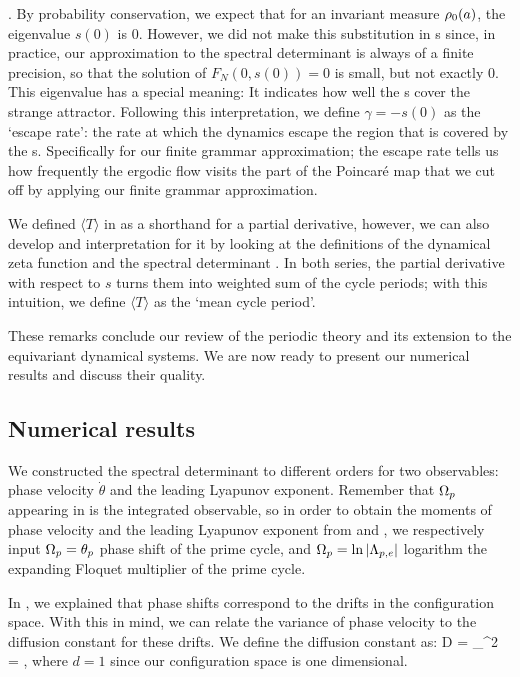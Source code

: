                         \label{e-Avgsigma} .
\eea
By probability conservation, we expect that for an invariant measure  $\rho_0(a)$,
the eigenvalue $s(0)$ is $0$. However, we did not make this substitution in \cycForm s since, in practice,
our approximation to the spectral determinant is always of a finite precision, so that
the solution of $F_N(0, s(0)) = 0$ is small, but not exactly $0$. This
eigenvalue has a special meaning: It indicates how well the \po s cover the
strange attractor. Following this interpretation, we define $\gamma = - s(0)$
as the `escape rate': the rate at which the dynamics escape the region that is
covered by the \po s. Specifically for our finite grammar approximation; the
escape rate tells us how frequently the ergodic flow visits the part of the
Poincar\'e map that we cut off by applying our finite grammar approximation.

We defined $\langle T \rangle$ in  as a shorthand for a partial
derivative, however, we can also develop and interpretation for it by looking
at the definitions of the dynamical zeta function  and the
spectral determinant . In both series, the partial
derivative with respect to $s$ turns them into weighted sum of the cycle
periods; with this intuition, we define $\langle T \rangle$ as the `mean cycle
period'.

These remarks conclude our review of the periodic theory and its
extension to the equivariant dynamical systems. We are now ready to present
our numerical results and discuss their quality.

\subsection{Numerical results}
\label{s-NumResults}

We constructed the spectral determinant  to different
orders for two observables: phase velocity $\dot{\theta}$ and the leading
Lyapunov exponent. Remember that $\Omega_p$ appearing in
 is the integrated observable, so in order to
obtain the moments of phase velocity and the leading Lyapunov exponent from
 and , we respectively input
$\Omega_p = \theta_p$ phase shift of the prime cycle, and
$\Omega_p = \ln |\Lambda_{p,e}|$ logarithm the expanding Floquet multiplier of
the prime cycle.

In , we explained that  phase shifts correspond to
the drifts in the configuration space. With this in mind, we can relate the
variance of phase velocity to the diffusion constant for these drifts. We define the
diffusion constant as:
\beq
    D =  \sigma_{\dot{\theta}}^2
      =  ,
\eeq
where $d=1$ since our configuration space is one dimensional.

